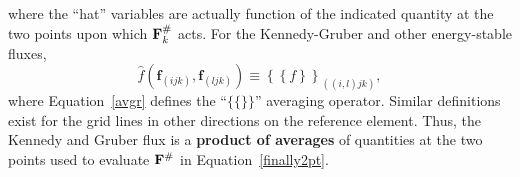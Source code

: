 where the ``hat'' variables are actually function of the indicated quantity
at the two points upon which ${\bf F}^{\#}_k$ acts. For the Kennedy-Gruber and other
energy-stable fluxes,
\begin{equation}
\hat{f}\left(\mathbf{f}_{(ijk)},\mathbf{f}_{(ljk)}\right)\equiv \left\{\left\{
f\right\}\right\}_{((i,l)jk)},
\label{ezhat}
\end{equation}
where Equation~\ref{avgr} defines the ``$\{\{\}\}$'' averaging operator.
Similar definitions exist for the grid lines in other directions on the reference
element. Thus, the Kennedy and Gruber flux is a \textbf{product of averages}
of quantities at the two points used to evaluate ${\bf F}^{\#}$ in Equation~\ref{finally2pt}.

